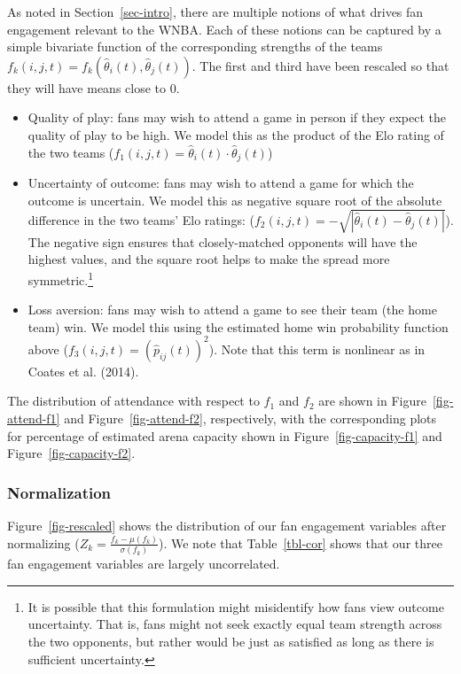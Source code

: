 \documentclass[
  letterpaper,
  DIV=11,
  numbers=noendperiod]{scrartcl}
\providecommand{\tightlist}{%
  \setlength{\itemsep}{0pt}\setlength{\parskip}{0pt}}
\begin{document}
As noted in Section~\ref{sec-intro}, there are multiple notions of what
drives fan engagement relevant to the WNBA. Each of these notions can be
captured by a simple bivariate function of the corresponding strengths
of the teams
\(f_k(i, j, t) = f_k(\hat{\theta}_i(t), \hat{\theta}_j(t))\). The first
and third have been rescaled so that they will have means close to 0.

\begin{itemize}
\tightlist
\item
  Quality of play: fans may wish to attend a game in person if they
  expect the quality of play to be high. We model this as the product of
  the Elo rating of the two teams
  (\(f_1(i, j, t) = \hat{\theta}_i(t) \cdot \hat{\theta}_j(t)\))
\item
  Uncertainty of outcome: fans may wish to attend a game for which the
  outcome is uncertain. We model this as negative square root of the
  absolute difference in the two teams' Elo ratings:
  (\(f_2(i, j, t) = -\sqrt{|\hat{\theta}_i(t) - \hat{\theta}_j(t)|}\)).
  The negative sign ensures that closely-matched opponents will have the
  highest values, and the square root helps to make the spread more
  symmetric.\footnote{It is possible that this formulation might
    misidentify how fans view outcome uncertainty. That is, fans might
    not seek exactly equal team strength across the two opponents, but
    rather would be just as satisfied as long as there is sufficient
    uncertainty.}
\item
  Loss aversion: fans may wish to attend a game to see their team (the
  home team) win. We model this using the estimated home win probability
  function above (\(f_3(i, j, t) = (\hat{p}_{ij}(t))^2\)). Note that
  this term is nonlinear as in Coates et al. (2014).
\end{itemize}

The distribution of attendance with respect to \(f_1\) and \(f_2\) are
shown in Figure~\ref{fig-attend-f1} and Figure~\ref{fig-attend-f2},
respectively, with the corresponding plots for percentage of estimated
arena capacity shown in Figure~\ref{fig-capacity-f1} and
Figure~\ref{fig-capacity-f2}.

\subsubsection{Normalization}\label{normalization}

Figure~\ref{fig-rescaled} shows the distribution of our fan engagement
variables after normalizing
(\(Z_k = \frac{f_k - \mu(f_k)}{\sigma(f_k)}\)). We note that
Table~\ref{tbl-cor} shows that our three fan engagement variables are
largely uncorrelated.
\end{document}
